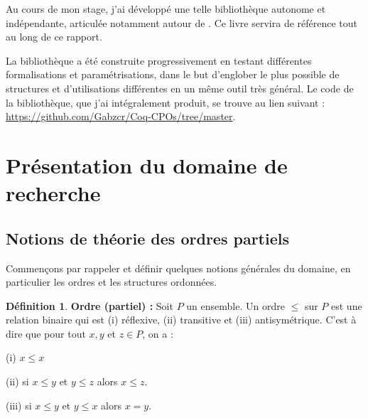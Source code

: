 \documentclass{article}
\newcommand{\yz}[1]{\textcolor{blue}{{[YZ:~#1]}}}
\theoremstyle{definition}
\newtheorem{definition}{Définition}[section]
\begin{document}
Au cours de mon stage, j'ai développé une telle bibliothèque autonome et indépendante, articulée notamment autour de \cite[chapitre 8]{main}. Ce livre servira de référence tout au long de ce rapport.

La bibliothèque a été construite progressivement en testant différentes formalisations et paramétrisations, dans le but d'englober le plus possible de structures et d'utilisations différentes en un même outil très général. Le code de la bibliothèque, que j'ai intégralement produit, se trouve au lien suivant \cite{code}: \href{https://github.com/Gabzcr/Coq-CPOs/tree/master}{https://github.com/Gabzcr/Coq-CPOs/tree/master}.



{
  \hypersetup{linkcolor=black}
  \tableofcontents
}

\section{Présentation du domaine de recherche}


\subsection{Notions de théorie des ordres partiels}

Commençons par rappeler et définir quelques notions générales du domaine, en particulier les ordres et les structures ordonnées.

\begin{definition}{\textbf{Ordre (partiel) : }}
Soit $P$ un ensemble. Un ordre $\leq$ sur $P$ est une relation binaire qui est (i) réflexive, (ii) transitive et (iii) antisymétrique. C'est à dire que pour tout $x, y$ et $z \in P$, on a :

(i) $x \leq x$

(ii) si $x \leq y$ et $y \leq z$ alors $x \leq z$.

(iii) si $x \leq y$ et $y \leq x$ alors $x = y$.
\end{definition}
\end{document}

